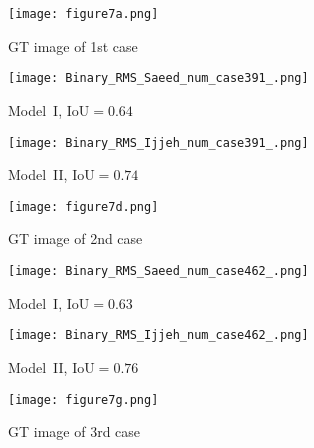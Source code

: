 \begin{sloppypar}
	
	\begin{figure}[ht!]
		\centering
		\begin{subfigure}[b]{0.32\textwidth}
			\centering
			\texttt{[image: figure7a.png]}
			\caption{GT image of 1st case}
			\label{fig:num_GT_391}
		\end{subfigure}
		\hfill
		\begin{subfigure}[b]{0.32\textwidth}
			\centering
			\texttt{[image: Binary\_RMS\_Saeed\_num\_case391\_.png]}
			\caption{Model~I, IoU\(=0.64\)}
			\label{fig:Convlstm_binary_RMS_391}
		\end{subfigure}
		\hfill
		\begin{subfigure}[b]{0.32\textwidth}
			\centering
			\texttt{[image: Binary\_RMS\_Ijjeh\_num\_case391\_.png]}
			\caption{Model~II, IoU\(=0.74\)}
			\label{fig:AE_binary_RMS_391}
		\end{subfigure}
		\par\medskip
		\begin{subfigure}[b]{0.32\textwidth}
			\centering
			\texttt{[image: figure7d.png]}
			\caption{GT image of 2nd case}
			\label{fig:num_GT_462}
		\end{subfigure}
		\hfill
		\begin{subfigure}[b]{0.32\textwidth}
			\centering
			\texttt{[image: Binary\_RMS\_Saeed\_num\_case462\_.png]}
			\caption{Model~I, IoU\(=0.63\)}
			\label{fig:Convlstm_binary_RMS_462}
		\end{subfigure}
		\hfill
		\begin{subfigure}[b]{0.32\textwidth}
			\centering
			\texttt{[image: Binary\_RMS\_Ijjeh\_num\_case462\_.png]}
			\caption{Model~II, IoU\(=0.76\)}
			\label{fig:AE_binary_RMS_462}
		\end{subfigure}
		\par\medskip
		\begin{subfigure}[b]{0.32\textwidth}
			\centering
			\texttt{[image: figure7g.png]}
			\caption{GT image of 3rd case}
			\label{fig:num_GT_453}
		\end{subfigure}
		\hfill	
		\begin{subfigure}[b]{0.32\textwidth}

\end{subfigure}
\end{figure}
\end{sloppypar}
